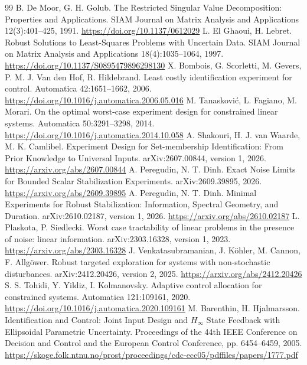 \documentclass[11pt,a4paper]{article}
\numberwithin{equation}{section}
\theoremstyle{definition}
\begin{document}
\begin{thebibliography}{99}
 B. De Moor, G. H. Golub. The Restricted Singular Value Decomposition: Properties and Applications. SIAM Journal on Matrix Analysis and Applications 12(3):401--425, 1991. \url{https://doi.org/10.1137/0612029}
 L. El Ghaoui, H. Lebret. Robust Solutions to Least-Squares Problems with Uncertain Data. SIAM Journal on Matrix Analysis and Applications 18(4):1035--1064, 1997. \url{https://doi.org/10.1137/S0895479896298130}
 X. Bombois, G. Scorletti, M. Gevers, P. M. J. Van den Hof, R. Hildebrand. Least costly identification experiment for control. Automatica 42:1651--1662, 2006. \url{https://doi.org/10.1016/j.automatica.2006.05.016}
 M. Tanaskovi\'c, L. Fagiano, M. Morari. On the optimal worst-case experiment design for constrained linear systems. Automatica 50:3291--3298, 2014. \url{https://doi.org/10.1016/j.automatica.2014.10.058}
 A. Shakouri, H. J. van Waarde, M. K. Camlibel. Experiment Design for Set-membership Identification: From Prior Knowledge to Universal Inputs. arXiv:2607.00844, version 1, 2026. \url{https://arxiv.org/abs/2607.00844}
 A. Peregudin, N. T. Dinh. Exact Noise Limits for Bounded Scalar Stabilization Experiments. arXiv:2609.39895, 2026. \url{https://arxiv.org/abs/2609.39895}
 A. Peregudin, N. T. Dinh. Minimal Experiments for Robust Stabilization: Information, Spectral Geometry, and Duration. arXiv:2610.02187, version 1, 2026. \url{https://arxiv.org/abs/2610.02187}
 L. Plaskota, P. Siedlecki. Worst case tractability of linear problems in the presence of noise: linear information. arXiv:2303.16328, version 1, 2023. \url{https://arxiv.org/abs/2303.16328}
 J. Venkatasubramanian, J. K\"ohler, M. Cannon, F. Allg\"ower. Robust targeted exploration for systems with non-stochastic disturbances. arXiv:2412.20426, version 2, 2025. \url{https://arxiv.org/abs/2412.20426}
 S. S. Tohidi, Y. Yildiz, I. Kolmanovsky. Adaptive control allocation for constrained systems. Automatica 121:109161, 2020. \url{https://doi.org/10.1016/j.automatica.2020.109161}
 M. Barenthin, H. Hjalmarsson. Identification and Control: Joint Input Design and $H_\infty$ State Feedback with Ellipsoidal Parametric Uncertainty. Proceedings of the 44th IEEE Conference on Decision and Control and the European Control Conference, pp. 6454--6459, 2005. \url{https://skoge.folk.ntnu.no/prost/proceedings/cdc-ecc05/pdffiles/papers/1777.pdf}

\end{thebibliography}
\end{document}
